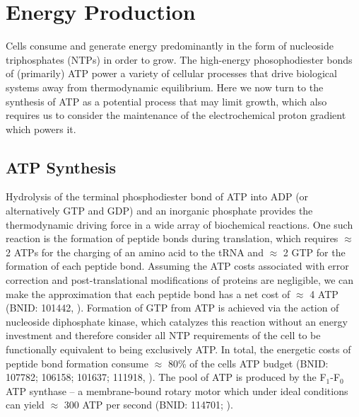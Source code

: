 \section{Energy Production}
Cells consume and generate energy predominantly in the form of nucleoside
triphosphates (NTPs) in order to grow. The high-energy phosophodiester bonds of
(primarily) ATP power a variety of cellular processes that drive biological
systems away from thermodynamic equilibrium. Here we now turn to the synthesis of ATP
as a potential process that may limit growth, which also requires us to consider
the maintenance of the electrochemical proton gradient which powers it.

\subsection{ATP Synthesis}
Hydrolysis of the terminal phosphodiester bond of ATP into ADP (or
alternatively GTP and GDP) and an inorganic phosphate provides the
thermodynamic driving force in a wide array of biochemical reactions. One
such reaction is the formation of peptide bonds during translation, which
requires $\approx$ 2 ATPs for the charging of an amino acid to the tRNA and
$\approx$ 2 GTP for the formation of each peptide bond. Assuming the ATP
costs associated with error correction and post-translational modifications
of proteins are negligible, we can make the approximation that each peptide
bond has a net cost of $\approx$ 4 ATP (BNID: 101442, \cite{milo2010}).
Formation of GTP from ATP is achieved via the action of nucleoside
diphosphate kinase, which catalyzes this reaction without an energy
investment \citep{lascu2000} and therefore consider all NTP requirements of
the cell to be functionally equivalent to being exclusively ATP. In total,
the energetic costs of peptide bond formation consume $\approx$ 80\% of the
cells ATP budget (BNID: 107782; 106158; 101637; 111918,
\cite{lynch2015,stouthamer1973}). The pool of ATP is produced by the
F$_1$-F$_0$ ATP synthase -- a membrane-bound rotary motor which under ideal
conditions can yield $\approx$ 300 ATP per second (BNID: 114701;
\cite{weber2003}).

